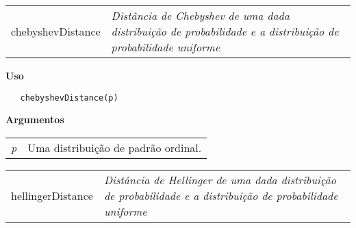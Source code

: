\documentclass[12pt,letterpaper]{article}
\begin{document}
\hrulefill   

\begin{table}[!h]
\begin{center}
\begin{tabularx}{\textwidth}{ X X}
\hspace{0.5cm} chebyshevDistance & \textit{Distância de Chebyshev de uma dada distribuição de probabilidade e a distribuição de probabilidade uniforme}\\
\end{tabularx}
\end{center}
\end{table} 

\vspace{-0.5cm}

\hrulefill  

\vspace{0.5cm}

\textbf{Uso}

\begin{lstlisting}
   chebyshevDistance(p)
\end{lstlisting}

\vspace{0.5cm}

\textbf{Argumentos}

\begin{table}[!h]
\begin{center}
\begin{tabularx}{\textwidth}{X X}
\hspace{0.5cm} \textit{p} & Uma distribuição de padrão ordinal.\\
\end{tabularx}
\end{center}
\end{table} 

\newpage


\hrulefill   

\begin{table}[!h]
\begin{center}
\begin{tabularx}{\textwidth}{ X X}
\hspace{0.5cm} hellingerDistance & \textit{Distância  de Hellinger de uma dada distribuição de probabilidade e a distribuição de probabilidade uniforme}\\
\end{tabularx}
\end{center}
\end{table} 
\end{document}
